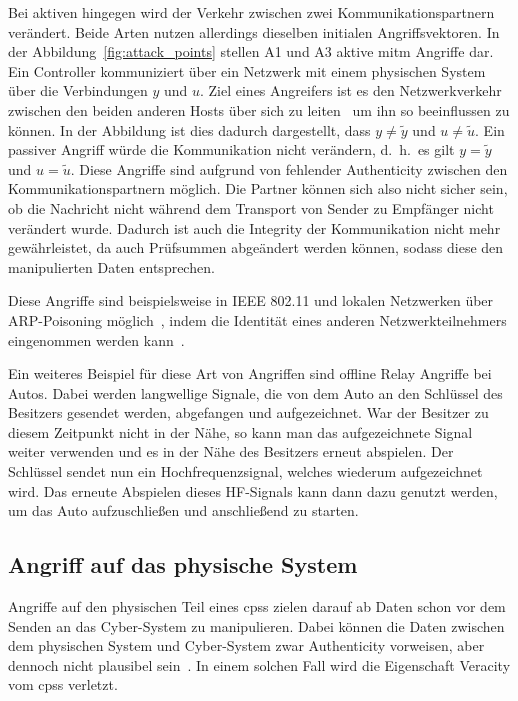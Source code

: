 \documentclass[final,bibliography=totocnumbered]{include/sikseminar}
\newcommand{\cps}{\glspl{cps}\xspace}
\begin{document}
    Bei aktiven hingegen wird der Verkehr zwischen zwei Kommunikationspartnern verändert.
    Beide Arten nutzen allerdings dieselben initialen Angriffsvektoren.
    In der Abbildung~\ref{fig:attack_points} stellen A1 und A3 aktive \gls{mitm} Angriffe dar.
    Ein Controller kommuniziert über ein Netzwerk mit einem physischen System über die Verbindungen $y$ und $u$.
    Ziel eines Angreifers ist es den Netzwerkverkehr zwischen den beiden anderen Hosts über sich zu leiten~\cite{WYX+10,FPA+18} um ihn so beeinflussen zu können.
    In der Abbildung ist dies dadurch dargestellt, dass $y \ne \tilde{y}$ und $u \ne \tilde{u}$.
    Ein passiver Angriff würde die Kommunikation nicht verändern, d.~h.\ es gilt $y = \tilde{y}$ und $u = \tilde{u}$.
    Diese Angriffe sind aufgrund von fehlender Authenticity zwischen den Kommunikationspartnern möglich.
    Die Partner können sich also nicht sicher sein, ob die Nachricht nicht während dem Transport von Sender zu Empfänger nicht verändert wurde.
    Dadurch ist auch die Integrity der Kommunikation nicht mehr gewährleistet, da auch Prüfsummen abgeändert werden können, sodass diese den manipulierten Daten entsprechen.

    Diese Angriffe sind beispielsweise in IEEE 802.11 und lokalen Netzwerken über ARP-Poisoning möglich~\cite{FIT+12}, indem die Identität eines anderen Netzwerkteilnehmers eingenommen werden kann~\cite{RN05}.

    Ein weiteres Beispiel für diese Art von Angriffen sind offline Relay Angriffe bei Autos.
    Dabei werden langwellige Signale, die von dem Auto an den Schlüssel des Besitzers gesendet werden, abgefangen und aufgezeichnet.
    War der Besitzer zu diesem Zeitpunkt nicht in der Nähe, so kann man das aufgezeichnete Signal weiter verwenden und es in der Nähe des Besitzers erneut abspielen.
    Der Schlüssel sendet nun ein Hochfrequenzsignal, welches wiederum aufgezeichnet wird.
    Das erneute Abspielen dieses HF-Signals kann dann dazu genutzt werden, um das Auto aufzuschließen und anschließend zu starten.~\cite{HLL+17}

    \subsection{Angriff auf das physische System}
    \label{subsec:physical-deception}
    Angriffe auf den physischen Teil eines \cps zielen darauf ab Daten schon vor dem Senden an das Cyber-System zu manipulieren.
    Dabei können die Daten zwischen dem physischen System und Cyber-System zwar Authenticity vorweisen, aber dennoch nicht plausibel sein~\cite{SFJ17}.
    In einem solchen Fall wird die Eigenschaft Veracity vom \cps verletzt.
\end{document}
